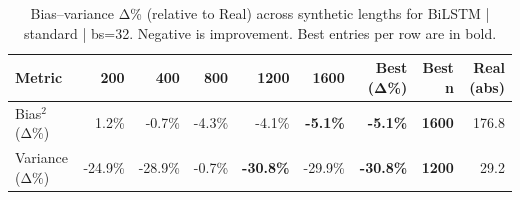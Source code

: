 \renewcommand{\arraystretch}{1.2}
\begin{table}[!t]
\centering
\footnotesize
\caption{Bias–variance Δ\% (relative to Real) across synthetic lengths for BiLSTM | standard | bs=32. Negative is improvement. Best entries per row are in bold.}
\label{tab:bvdelta_BiLSTM_standard_bs32}
\setlength{\tabcolsep}{5pt}
\begin{tabular}{lrrrrrrrr}
\toprule
Metric & 200 & 400 & 800 & 1200 & 1600 & Best (Δ\%) & Best n & Real (abs) \\
\midrule
Bias$^2$ (Δ\%) & 1.2\% & -0.7\% & -4.3\% & -4.1\% & \textbf{-5.1\%} & \textbf{-5.1\%} & \textbf{1600} & 176.8 \\
Variance (Δ\%) & -24.9\% & -28.9\% & -0.7\% & \textbf{-30.8\%} & -29.9\% & \textbf{-30.8\%} & \textbf{1200} & 29.2 \\
\bottomrule
\end{tabular}

\end{table}

